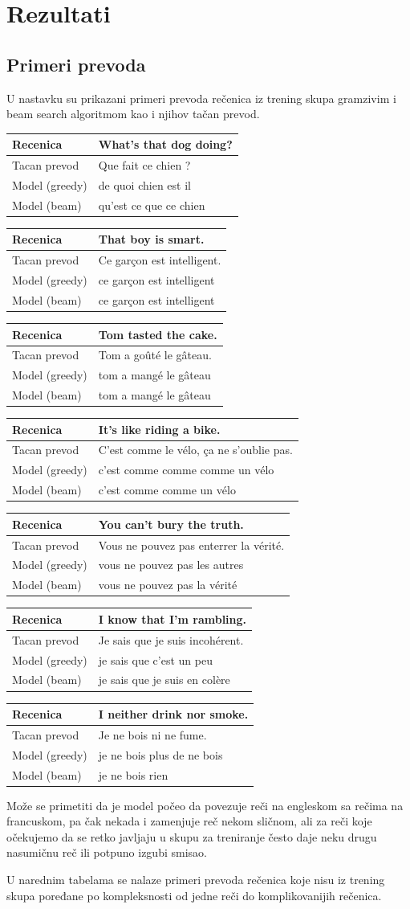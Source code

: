 \documentclass[a4paper]{article}
\begin{document}
\section{Rezultati}

\subsection{Primeri prevoda}

\newcommand\translation[4] 
{\begin{center}
  \begin{tabularx}{\textwidth}{ |l|X| } 
    \hline
    Recenica & #1 \\
    \hline
    Tacan prevod & #2 \\
    \hline
    Model (greedy) & #3 \\
    \hline
    Model (beam) & #4 \\
    \hline
  \end{tabularx}
\end{center}}

U nastavku su prikazani primeri prevoda rečenica iz trening skupa gramzivim i beam search algoritmom kao i njihov tačan prevod.

\translation
{What's that dog doing?}
{Que fait ce chien ?}
{de quoi chien est il}
{qu'est ce que ce chien}
\translation
{That boy is smart.}
{Ce garçon est intelligent.}
{ce garçon est intelligent}
{ce garçon est intelligent}
\translation
{Tom tasted the cake.}
{Tom a goûté le gâteau.}
{tom a mangé le gâteau}
{tom a mangé le gâteau}
\translation
{It's like riding a bike.}
{C'est comme le vélo, ça ne s'oublie pas.}
{c'est comme comme comme un vélo}
{c'est comme comme un vélo}
\translation
{You can't bury the truth.}
{Vous ne pouvez pas enterrer la vérité.}
{vous ne pouvez pas les autres}
{vous ne pouvez pas la vérité}
\translation
{I know that I'm rambling.}
{Je sais que je suis incohérent.}
{je sais que c'est un peu}
{je sais que je suis en colère}
\translation
{I neither drink nor smoke.}
{Je ne bois ni ne fume.}
{je ne bois plus de ne bois}
{je ne bois rien}

Može se primetiti da je model počeo da povezuje reči na engleskom sa rečima na francuskom, pa čak nekada i zamenjuje reč nekom sličnom, ali za reči koje očekujemo da se retko javljaju u skupu za treniranje često daje neku drugu nasumičnu reč ili potpuno izgubi smisao.

U narednim tabelama se nalaze primeri prevoda rečenica koje nisu iz trening skupa poređane po kompleksnosti od jedne reči do komplikovanijih rečenica.
\end{document}

